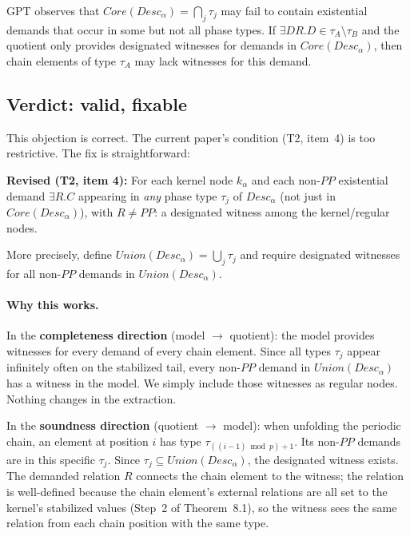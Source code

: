 \documentclass[11pt]{article}
\newcommand{\DR}{\mathit{DR}}
\newcommand{\PP}{\mathit{PP}}
\newcommand{\Desc}{\mathit{Desc}}
\newcommand{\Core}{\mathit{Core}}
\begin{document}
GPT observes that $\Core(\Desc_\alpha) = \bigcap_j \tau_j$ may fail to
contain existential demands that occur in some but not all phase types.
If $\exists\DR.D \in \tau_A \setminus \tau_B$ and the quotient only
provides designated witnesses for demands in $\Core(\Desc_\alpha)$, then
chain elements of type $\tau_A$ may lack witnesses for this demand.

\subsection{Verdict: valid, fixable}

This objection is correct.  The current paper's condition (T2, item~4) is
too restrictive.  The fix is straightforward:

\medskip\noindent\textbf{Revised (T2, item 4):}
For each kernel node $k_\alpha$ and each non-$\PP$ existential demand
$\exists R.C$ appearing in \emph{any} phase type $\tau_j$ of
$\Desc_\alpha$ (not just in $\Core(\Desc_\alpha)$), with $R \ne \PP$: a
designated witness among the kernel/regular nodes.

\medskip
More precisely, define $\mathit{Union}(\Desc_\alpha) = \bigcup_j \tau_j$
and require designated witnesses for all non-$\PP$ demands in
$\mathit{Union}(\Desc_\alpha)$.

\paragraph{Why this works.}
In the \textbf{completeness direction} (model $\to$ quotient): the model
provides witnesses for every demand of every chain element.  Since all
types $\tau_j$ appear infinitely often on the stabilized tail, every
non-$\PP$ demand in $\mathit{Union}(\Desc_\alpha)$ has a witness in the
model.  We simply include those witnesses as regular nodes.  Nothing
changes in the extraction.

In the \textbf{soundness direction} (quotient $\to$ model): when
unfolding the periodic chain, an element at position $i$ has type
$\tau_{((i-1) \bmod p) + 1}$.  Its non-$\PP$ demands are in this
specific $\tau_j$.  Since $\tau_j \subseteq \mathit{Union}(\Desc_\alpha)$,
the designated witness exists.  The demanded relation $R$ connects the
chain element to the witness; the relation is well-defined because
the chain element's external relations are all set to the kernel's
stabilized values (Step~2 of Theorem~8.1), so the witness sees the
same relation from each chain position with the same type.
\end{document}
